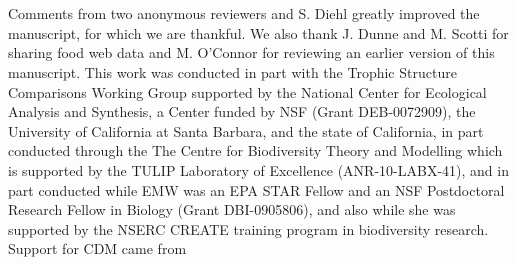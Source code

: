 \documentclass[12pt,a4paper,oneside]{article}
\begin{document}
\\
\newpage
{}\\
\noindent Comments from two anonymous reviewers and S. Diehl greatly
improved the manuscript, for which we are thankful. We also thank J. Dunne and M. Scotti for sharing
food web data and M. O'Connor for reviewing an earlier version of this
manuscript. This work was conducted in part with the Trophic
Structure Comparisons Working Group supported by the National Center
for Ecological Analysis and Synthesis, a Center funded by NSF (Grant
DEB-0072909), the University of California at Santa Barbara, and the
state of California, in part conducted through the The Centre for Biodiversity Theory and Modelling which is supported by the TULIP Laboratory of Excellence (ANR-10-LABX-41), and in part conducted while EMW was an EPA STAR
Fellow and an NSF Postdoctoral Research Fellow in Biology (Grant DBI-0905806), and also while she was supported by the NSERC CREATE training program in biodiversity research. Support for CDM came from 
\end{document}
